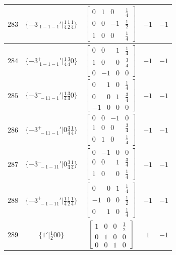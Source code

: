 \documentclass[fleqn,8pt]{jsarticle}
\begin{document}
\begin{longtable}{ccccc}
$ 283 $ & $ \{-3^{-}_{\,\,1-1-1}{}'|\frac{1}{4} \frac{1}{2} \frac{1}{4}\} $ & $ \begin{bmatrix} 0 & 1 & 0 & \frac{1}{4} \\ 0 & 0 & -1 & \frac{1}{2} \\ 1 & 0 & 0 & \frac{1}{4} \end{bmatrix} $ & $ -1 $ & $ -1 $ \\ \hline
$ 284 $ & $ \{-3^{+}_{\,\,1-1-1}{}'|\frac{1}{4} \frac{3}{4} 0\} $ & $ \begin{bmatrix} 0 & 0 & 1 & \frac{1}{4} \\ 1 & 0 & 0 & \frac{3}{4} \\ 0 & -1 & 0 & 0 \end{bmatrix} $ & $ -1 $ & $ -1 $ \\ \hline
$ 285 $ & $ \{-3^{-}_{\,\,-11-1}{}'|\frac{1}{4} \frac{3}{4} 0\} $ & $ \begin{bmatrix} 0 & 1 & 0 & \frac{1}{4} \\ 0 & 0 & 1 & \frac{3}{4} \\ -1 & 0 & 0 & 0 \end{bmatrix} $ & $ -1 $ & $ -1 $ \\ \hline
$ 286 $ & $ \{-3^{+}_{\,\,-11-1}{}'|0 \frac{3}{4} \frac{1}{4}\} $ & $ \begin{bmatrix} 0 & 0 & -1 & 0 \\ 1 & 0 & 0 & \frac{3}{4} \\ 0 & 1 & 0 & \frac{1}{4} \end{bmatrix} $ & $ -1 $ & $ -1 $ \\ \hline
$ 287 $ & $ \{-3^{-}_{\,\,-1-11}{}'|0 \frac{3}{4} \frac{1}{4}\} $ & $ \begin{bmatrix} 0 & -1 & 0 & 0 \\ 0 & 0 & 1 & \frac{3}{4} \\ 1 & 0 & 0 & \frac{1}{4} \end{bmatrix} $ & $ -1 $ & $ -1 $ \\ \hline
$ 288 $ & $ \{-3^{+}_{\,\,-1-11}{}'|\frac{1}{4} \frac{1}{2} \frac{1}{4}\} $ & $ \begin{bmatrix} 0 & 0 & 1 & \frac{1}{4} \\ -1 & 0 & 0 & \frac{1}{2} \\ 0 & 1 & 0 & \frac{1}{4} \end{bmatrix} $ & $ -1 $ & $ -1 $ \\ \hline
$ 289 $ & $ \{1{}'|\frac{1}{2} 0 0\} $ & $ \begin{bmatrix} 1 & 0 & 0 & \frac{1}{2} \\ 0 & 1 & 0 & 0 \\ 0 & 0 & 1 & 0 \end{bmatrix} $ & $ 1 $ & $ -1 $ \\ \hline

\end{longtable}
\end{document}
